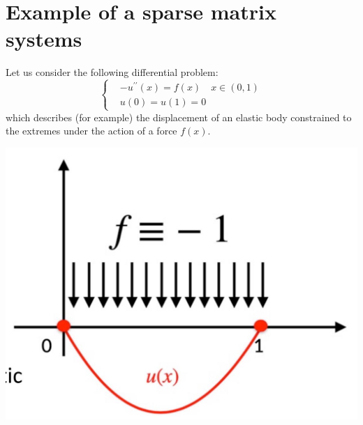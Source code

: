 \documentclass[11pt]{book}
\begin{document}
\section*{Example of a sparse matrix systems}
Let us consider the following differential problem:
$$
\begin{cases}
& -u^{\prime \prime}(x)=f(x) \quad x \in(0,1) \\
& u(0)=u(1)=0
\end{cases}
$$
which describes (for example) the displacement of an elastic body constrained to the extremes under the action of a force $f(x)$.
\begin{center}
\includegraphics[scale = 0.2,max width=\textwidth]{2023_09_05_b72ccc85584d9dc6fb5cg-032(1)}
\end{center}
\end{document}
